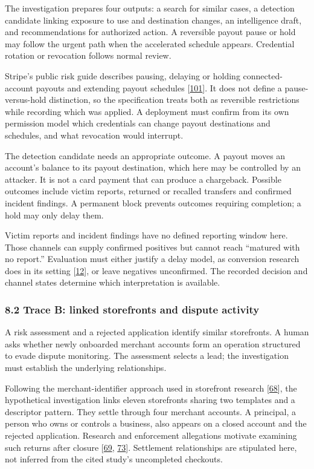 \documentclass[
  11pt,
]{article}
\begin{document}
The investigation prepares four outputs: a search for similar cases, a
detection candidate linking exposure to use and destination changes, an
intelligence draft, and recommendations for authorized action. A
reversible payout pause or hold may follow the urgent path when the
accelerated schedule appears. Credential rotation or revocation follows
normal review.

Stripe's public risk guide describes pausing, delaying or holding
connected-account payouts and extending payout schedules
{[}\protect\hyperlink{ref-Stripe2026Connect}{101}{]}. It does not define
a pause-versus-hold distinction, so the specification treats both as
reversible restrictions while recording which was applied. A deployment
must confirm from its own permission model which credentials can change
payout destinations and schedules, and what revocation would interrupt.

The detection candidate needs an appropriate outcome. A payout moves an
account's balance to its payout destination, which here may be
controlled by an attacker. It is not a card payment that can produce a
chargeback. Possible outcomes include victim reports, returned or
recalled transfers and confirmed incident findings. A permanent block
prevents outcomes requiring completion; a hold may only delay them.

Victim reports and incident findings have no defined reporting window
here. Those channels can supply confirmed positives but cannot reach
``matured with no report.'' Evaluation must either justify a delay
model, as conversion research does in its setting
{[}\protect\hyperlink{ref-Chapelle2014Delayed}{12}{]}, or leave
negatives unconfirmed. The recorded decision and channel states
determine which interpretation is available.

\hypertarget{trace-b-linked-storefronts-and-dispute-activity}{%
\subsubsection{8.2 Trace B: linked storefronts and dispute
activity}\label{trace-b-linked-storefronts-and-dispute-activity}}

A risk assessment and a rejected application identify similar
storefronts. A human asks whether newly onboarded merchant accounts form
an operation structured to evade dispute monitoring. The assessment
selects a lead; the investigation must establish the underlying
relationships.

Following the merchant-identifier approach used in storefront research
{[}\protect\hyperlink{ref-Bitaab2025}{68}{]}, the hypothetical
investigation links eleven storefronts sharing two templates and a
descriptor pattern. They settle through four merchant accounts. A
principal, a person who owns or controls a business, also appears on a
closed account and the rejected application. Research and enforcement
allegations motivate examining such returns after closure
{[}\protect\hyperlink{ref-McCoy2012}{69},
\protect\hyperlink{ref-FTC2019Allied}{73}{]}. Settlement relationships
are stipulated here, not inferred from the cited study's uncompleted
checkouts.
\end{document}

